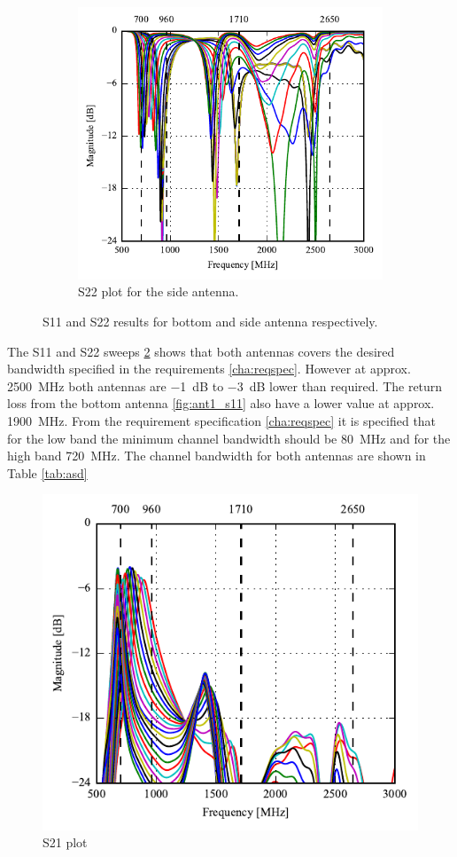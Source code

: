 \begin{figure}[htbp]
\begin{subfigure}[b]{0.49\linewidth}
        \includegraphics{img/tech_sol/monopole/s22_sweep}
        \caption{S22 plot for the side antenna.}
        \label{fig:ant1_s22}
    \end{subfigure}
    \caption{S11 and S22 results for bottom and side antenna respectively.}
    \label{fig:ant1_sparam}
\end{figure}
The S11 and S22 sweeps \ref{fig:ant1_sparam} shows that both antennas covers the desired bandwidth specified in the requirements \ref{cha:reqspec}. However at approx. \SI{2500}{MHz} both antennas are \SI{-1}{dB} to \SI{-3}{dB} lower than required. The return loss from the bottom antenna \ref{fig:ant1_s11} also have a lower value at approx. \SI{1900}{MHz}. From the requirement specification \ref{cha:reqspec} it is specified that for the low band the minimum channel bandwidth should be \SI{80}{MHz} and for the high band \SI{720}{MHz}. The channel bandwidth for both antennas are shown in Table \ref{tab:asd}     

\begin{figure}[htbp]%
  \centering
  \includegraphics{img/tech_sol/monopole/s21_sweep}
  \caption{S21 plot}
  \label{fig:ant1_s21}
\end{figure}



